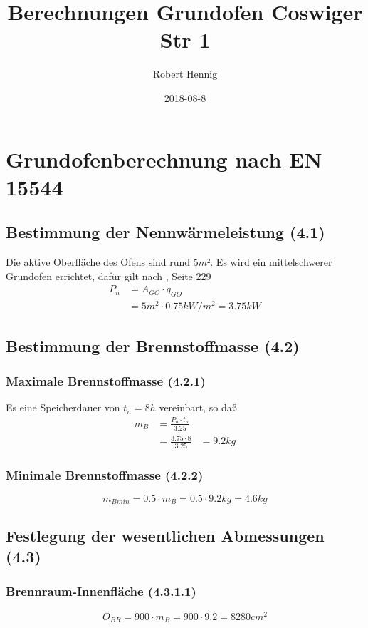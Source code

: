 \documentclass[a4paper,10pt,twoside]{article}
\author{Robert Hennig}
\date{2018-08-8}
\title{Berechnungen Grundofen Coswiger Str 1}
\begin{document}
\maketitle
\setcounter{tocdepth}{2}
\tableofcontents


\section{Grundofenberechnung nach EN 15544 \cite{EN15544}}
\label{sec:org9643df5}
\subsection{Bestimmung der Nennwärmeleistung (4.1)}
\label{sec:orgf8bad2e}
Die aktive Oberfläche des Ofens sind rund \(5 m²\).
Es wird ein mittelschwerer Grundofen errichtet,
dafür gilt nach \cite{Herrmann2011}, Seite 229 
\begin{align}
P_n & = A_{GO} \cdot q_{GO} \\
    & = 5 m^2 \cdot 0.75 kW/m^2 = 3.75 kW
\end{align}
\subsection{Bestimmung der Brennstoffmasse (4.2)}
\label{sec:org4b85f9c}
\subsubsection{Maximale Brennstoffmasse (4.2.1)}
\label{sec:orgd936a7e}
Es eine Speicherdauer von \(t_n=8h\) vereinbart, so daß
\begin{align}
m_B & = \frac{P_n \cdot t_n}{3.25} \\
    & = \frac{3.75 \cdot 8}{3.25} & = 9.2 kg
\end{align}
\subsubsection{Minimale Brennstoffmasse (4.2.2)}
\label{sec:orgccbc740}
\begin{equation}
m_{Bmin} = 0.5 \cdot m_B = 0.5 \cdot 9.2 kg = 4.6 kg
\end{equation}

\subsection{Festlegung der wesentlichen Abmessungen (4.3)}
\label{sec:org11d49fa}
\subsubsection{Brennraum-Innenfläche (4.3.1.1)}
\label{sec:org10b70b4}
\begin{equation}
O_{BR}= 900 \cdot m_{B} = 900 \cdot 9.2 = 8280 cm^2
\end{equation}
\end{document}
